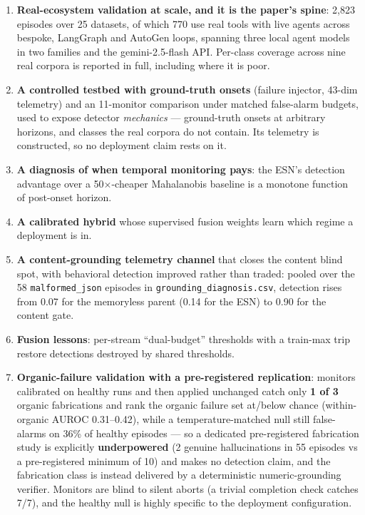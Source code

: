 \documentclass{article}
\begin{document}
\begin{enumerate}
    \item \textbf{Real-ecosystem validation at scale, and it is the paper's spine}: 2,823 episodes over 25 datasets, of which 770 use real tools with live agents across bespoke, LangGraph and AutoGen loops, spanning three local agent models in two families and the gemini-2.5-flash API. Per-class coverage across nine real corpora is reported in full, including where it is poor.
    \item \textbf{A controlled testbed with ground-truth onsets} (failure injector, 43-dim telemetry) and an 11-monitor comparison under matched false-alarm budgets, used to expose detector \emph{mechanics} --- ground-truth onsets at arbitrary horizons, and classes the real corpora do not contain. Its telemetry is constructed, so no deployment claim rests on it.
    \item \textbf{A diagnosis of when temporal monitoring pays}: the ESN's detection advantage over a 50$\times$-cheaper Mahalanobis baseline is a monotone function of post-onset horizon.
    \item \textbf{A calibrated hybrid} whose supervised fusion weights learn which regime a deployment is in.
    \item \textbf{A content-grounding telemetry channel} that closes the content blind spot, with behavioral detection improved rather than traded: pooled over the 58 \texttt{malformed\_json} episodes in \texttt{grounding\_diagnosis.csv}, detection rises from 0.07 for the memoryless parent (0.14 for the ESN) to 0.90 for the content gate.
    \item \textbf{Fusion lessons}: per-stream ``dual-budget'' thresholds with a train-max trip restore detections destroyed by shared thresholds.
    \item \textbf{Organic-failure validation with a pre-registered replication}: monitors calibrated on healthy runs and then applied unchanged catch only \textbf{1 of 3} organic fabrications and rank the organic failure set at/below chance (within-organic AUROC 0.31--0.42), while a temperature-matched null still false-alarms on 36\% of healthy episodes --- so a dedicated pre-registered fabrication study is explicitly \textbf{underpowered} (2 genuine hallucinations in 55 episodes vs a pre-registered minimum of 10) and makes no detection claim, and the fabrication class is instead delivered by a deterministic numeric-grounding verifier. Monitors are blind to silent aborts (a trivial completion check catches 7/7), and the healthy null is highly specific to the deployment configuration.
\end{enumerate}
\end{document}
